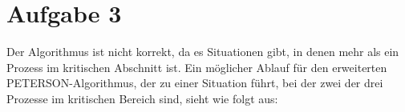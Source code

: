\documentclass[11pt,a4paper,DIV=10,]{scrartcl}
\begin{document}
\section*{Aufgabe 3}
Der Algorithmus ist nicht korrekt, da es Situationen gibt, in denen mehr als ein Prozess im kritischen Abschnitt ist. Ein möglicher Ablauf für den erweiterten PETERSON-Algorithmus, der zu einer Situation führt, bei der zwei der drei Prozesse im kritischen Bereich sind, sieht wie folgt aus: 
\end{document}
